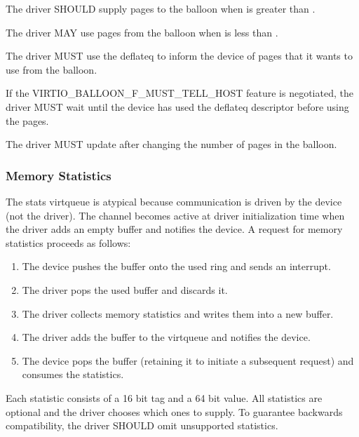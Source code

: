 The driver SHOULD supply pages to the balloon when  is
greater than .

The driver MAY use pages from the balloon when  is
less than .

The driver MUST use the deflateq to inform the device of pages that it
wants to use from the balloon.

If the VIRTIO_BALLOON_F_MUST_TELL_HOST feature is negotiated, the
driver MUST wait until the device has used the deflateq descriptor
before using the pages.

The driver MUST update  after changing the number
of pages in the balloon.

\subsubsection{Memory Statistics}\label{sec:Device Types / Memory Balloon Device / Device Operation / Memory Statistics}

The stats virtqueue is atypical because communication is driven
by the device (not the driver). The channel becomes active at
driver initialization time when the driver adds an empty buffer
and notifies the device. A request for memory statistics proceeds
as follows:

\begin{enumerate}
\item The device pushes the buffer onto the used ring and sends an
  interrupt.

\item The driver pops the used buffer and discards it.

\item The driver collects memory statistics and writes them into a
  new buffer.

\item The driver adds the buffer to the virtqueue and notifies the
  device.

\item The device pops the buffer (retaining it to initiate a
  subsequent request) and consumes the statistics.
\end{enumerate}

  Each statistic consists of a 16 bit
  tag and a 64 bit value. All statistics are optional and the
  driver chooses which ones to supply. To guarantee backwards
  compatibility, the driver SHOULD omit unsupported statistics.

